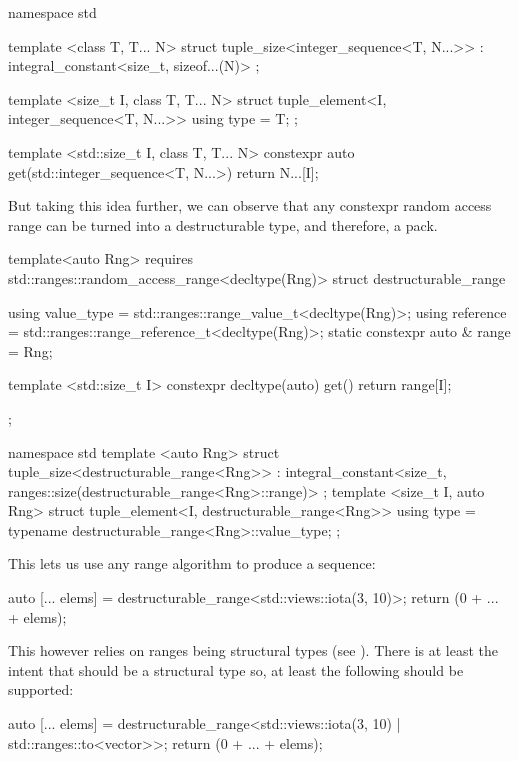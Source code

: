 \documentclass{wg21}
\begin{document}
\begin{colorblock}
namespace std {
    template <class T, T... N>
    struct tuple_size<integer_sequence<T, N...>>
    : integral_constant<size_t, sizeof...(N)>
    { };

    template <size_t I,  class T, T... N>
    struct tuple_element<I, integer_sequence<T, N...>> {
        using type = T;
    };

    template <std::size_t I,  class T, T... N>
    constexpr auto get(std::integer_sequence<T, N...>) {
        return N...[I];
    }
}
\end{colorblock}

But taking this idea further, we can observe that any constexpr random access range can be turned into a destructurable type, and therefore, a pack.

\begin{colorblock}
template<auto Rng>
requires std::ranges::random_access_range<decltype(Rng)>
struct destructurable_range {
    using value_type = std::ranges::range_value_t<decltype(Rng)>;
    using reference  = std::ranges::range_reference_t<decltype(Rng)>;
    static constexpr auto & range = Rng;

    template <std::size_t I>
    constexpr decltype(auto) get() {
        return range[I];
    }
};

namespace std {
    template <auto Rng>
    struct tuple_size<destructurable_range<Rng>>
    : integral_constant<size_t, ranges::size(destructurable_range<Rng>::range)>
    { };
    template <size_t I,  auto Rng>
    struct tuple_element<I, destructurable_range<Rng>> {
        using type = typename destructurable_range<Rng>::value_type;
    };
}
\end{colorblock}

This lets us use any range algorithm to produce a sequence:

\begin{colorblock}
auto [... elems] = destructurable_range<std::views::iota(3, 10)>{};
return (0 + ... + elems);
\end{colorblock}


This however relies on ranges being structural types (see ).
There is at least the intent that  should be a structural type so, at least the following should be supported:

\begin{colorblock}
auto [... elems] = destructurable_range<std::views::iota(3, 10) | std::ranges::to<vector>>{};
return (0 + ... + elems);
\end{colorblock}
\end{document}
